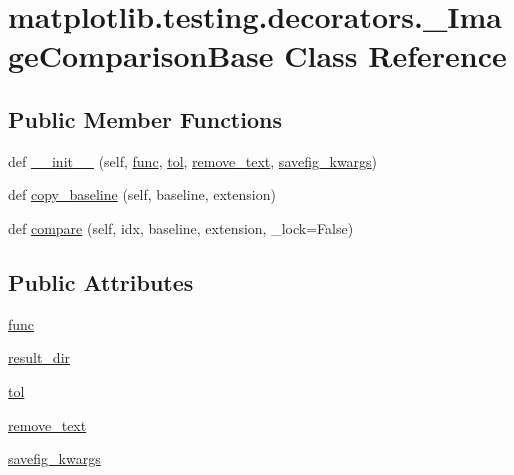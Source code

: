 \hypertarget{classmatplotlib_1_1testing_1_1decorators_1_1__ImageComparisonBase}{}\section{matplotlib.\+testing.\+decorators.\+\_\+\+Image\+Comparison\+Base Class Reference}
\label{classmatplotlib_1_1testing_1_1decorators_1_1__ImageComparisonBase}
\subsection*{Public Member Functions}
\begin{DoxyCompactItemize}
\item 
def \hyperlink{classmatplotlib_1_1testing_1_1decorators_1_1__ImageComparisonBase_a5c436f72f703de50d46131934810ce2a}{\+\_\+\+\_\+init\+\_\+\+\_\+} (self, \hyperlink{classmatplotlib_1_1testing_1_1decorators_1_1__ImageComparisonBase_ac5af8370af99cfb7829dcbeafeae7f60}{func}, \hyperlink{classmatplotlib_1_1testing_1_1decorators_1_1__ImageComparisonBase_a1267da29dd0897aaa1b664755fd5ddf0}{tol}, \hyperlink{classmatplotlib_1_1testing_1_1decorators_1_1__ImageComparisonBase_ac51117638b02be2aa9478f006011dcca}{remove\+\_\+text}, \hyperlink{classmatplotlib_1_1testing_1_1decorators_1_1__ImageComparisonBase_a4f661638a4dabac17d7da8ef477c9332}{savefig\+\_\+kwargs})
\item 
def \hyperlink{classmatplotlib_1_1testing_1_1decorators_1_1__ImageComparisonBase_a3886ee9d12246feb5170edc71ae7f384}{copy\+\_\+baseline} (self, baseline, extension)
\item 
def \hyperlink{classmatplotlib_1_1testing_1_1decorators_1_1__ImageComparisonBase_af1646139336452f24a470b531e1ef171}{compare} (self, idx, baseline, extension, \+\_\+lock=False)
\end{DoxyCompactItemize}
\subsection*{Public Attributes}
\begin{DoxyCompactItemize}
\item 
\hyperlink{classmatplotlib_1_1testing_1_1decorators_1_1__ImageComparisonBase_ac5af8370af99cfb7829dcbeafeae7f60}{func}
\item 
\hyperlink{classmatplotlib_1_1testing_1_1decorators_1_1__ImageComparisonBase_a8dc08464594644144a80eb6652a18ea7}{result\+\_\+dir}
\item 
\hyperlink{classmatplotlib_1_1testing_1_1decorators_1_1__ImageComparisonBase_a1267da29dd0897aaa1b664755fd5ddf0}{tol}
\item 
\hyperlink{classmatplotlib_1_1testing_1_1decorators_1_1__ImageComparisonBase_ac51117638b02be2aa9478f006011dcca}{remove\+\_\+text}
\item 
\hyperlink{classmatplotlib_1_1testing_1_1decorators_1_1__ImageComparisonBase_a4f661638a4dabac17d7da8ef477c9332}{savefig\+\_\+kwargs}
\end{DoxyCompactItemize}


